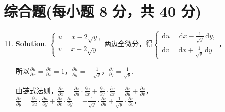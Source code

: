 \documentclass[../Main.tex]{subfiles}
\begin{document}
\section{综合题(每小题 8 分，共 40 分)}
\begin{enumerate}
    \setcounter{enumi}{10}
    \item \textbf{Solution}. $\begin{cases}
                  u = x-2\sqrt{y}, \\
                  v = x+2\sqrt{y}
              \end{cases}$两边全微分，得$\begin{cases}
                  \mathrm{d}u = \mathrm{d}x - \frac{1}{\sqrt{y}}\,\mathrm{d}y, \\[6pt]
                  \mathrm{d}v = \mathrm{d}x + \frac{1}{\sqrt{y}}\,\mathrm{d}y
              \end{cases}$，

          所以$\frac{\partial u}{\partial x}= \frac{\partial v}{\partial x}= 1$，$\frac{\partial
                  u}{\partial y}= -\frac{1}{\sqrt{y}}$，$\frac{\partial v}{\partial y}= \frac{1}{\sqrt{y}}$.

          由链式法则，$\frac{\partial z}{\partial x}= \frac{\partial z}{\partial u}\cdot
              \frac{\partial u}{\partial x}+ \frac{\partial z}{\partial v}\cdot \frac{\partial
                  v}{\partial x}= \frac{\partial z}{\partial u}+ \frac{\partial z}{\partial
                  v}$，$\frac{\partial z}{\partial y}= \frac{\partial z}{\partial u}\cdot \frac{\partial
                  u}{\partial y}+ \frac{\partial z}{\partial v}\cdot \frac{\partial v}{\partial
                  y}= -\frac{1}{\sqrt{y}}\cdot \frac{\partial z}{\partial u}+ \frac{1}{\sqrt{y}}
              \cdot \frac{\partial z}{\partial v}$，


\end{enumerate}
\end{document}
